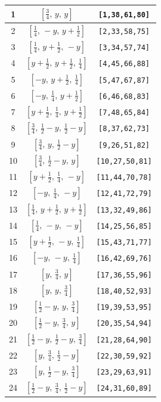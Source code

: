 \documentclass[fleqn,8pt]{jsarticle}
\begin{document}
\begin{longtable}{ccc}
1 & $\left[ \frac{3}{4},\, y,\, y \right]$ & {\tt [1,38,61,80]} \\ \hline
2 & $\left[ \frac{1}{4},\, - y,\, y + \frac{1}{2} \right]$ & {\tt [2,33,58,75]} \\ \hline
3 & $\left[ \frac{1}{4},\, y + \frac{1}{2},\, - y \right]$ & {\tt [3,34,57,74]} \\ \hline
4 & $\left[ y + \frac{1}{2},\, y + \frac{1}{2},\, \frac{1}{4} \right]$ & {\tt [4,45,66,88]} \\ \hline
5 & $\left[ - y,\, y + \frac{1}{2},\, \frac{1}{4} \right]$ & {\tt [5,47,67,87]} \\ \hline
6 & $\left[ - y,\, \frac{1}{4},\, y + \frac{1}{2} \right]$ & {\tt [6,46,68,83]} \\ \hline
7 & $\left[ y + \frac{1}{2},\, \frac{1}{4},\, y + \frac{1}{2} \right]$ & {\tt [7,48,65,84]} \\ \hline
8 & $\left[ \frac{3}{4},\, \frac{1}{2} - y,\, \frac{1}{2} - y \right]$ & {\tt [8,37,62,73]} \\ \hline
9 & $\left[ \frac{3}{4},\, y,\, \frac{1}{2} - y \right]$ & {\tt [9,26,51,82]} \\ \hline
10 & $\left[ \frac{3}{4},\, \frac{1}{2} - y,\, y \right]$ & {\tt [10,27,50,81]} \\ \hline
11 & $\left[ y + \frac{1}{2},\, \frac{1}{4},\, - y \right]$ & {\tt [11,44,70,78]} \\ \hline
12 & $\left[ - y,\, \frac{1}{4},\, - y \right]$ & {\tt [12,41,72,79]} \\ \hline
13 & $\left[ \frac{1}{4},\, y + \frac{1}{2},\, y + \frac{1}{2} \right]$ & {\tt [13,32,49,86]} \\ \hline
14 & $\left[ \frac{1}{4},\, - y,\, - y \right]$ & {\tt [14,25,56,85]} \\ \hline
15 & $\left[ y + \frac{1}{2},\, - y,\, \frac{1}{4} \right]$ & {\tt [15,43,71,77]} \\ \hline
16 & $\left[ - y,\, - y,\, \frac{1}{4} \right]$ & {\tt [16,42,69,76]} \\ \hline
17 & $\left[ y,\, \frac{3}{4},\, y \right]$ & {\tt [17,36,55,96]} \\ \hline
18 & $\left[ y,\, y,\, \frac{3}{4} \right]$ & {\tt [18,40,52,93]} \\ \hline
19 & $\left[ \frac{1}{2} - y,\, y,\, \frac{3}{4} \right]$ & {\tt [19,39,53,95]} \\ \hline
20 & $\left[ \frac{1}{2} - y,\, \frac{3}{4},\, y \right]$ & {\tt [20,35,54,94]} \\ \hline
21 & $\left[ \frac{1}{2} - y,\, \frac{1}{2} - y,\, \frac{3}{4} \right]$ & {\tt [21,28,64,90]} \\ \hline
22 & $\left[ y,\, \frac{3}{4},\, \frac{1}{2} - y \right]$ & {\tt [22,30,59,92]} \\ \hline
23 & $\left[ y,\, \frac{1}{2} - y,\, \frac{3}{4} \right]$ & {\tt [23,29,63,91]} \\ \hline
24 & $\left[ \frac{1}{2} - y,\, \frac{3}{4},\, \frac{1}{2} - y \right]$ & {\tt [24,31,60,89]} \\
\end{longtable}
\end{document}
